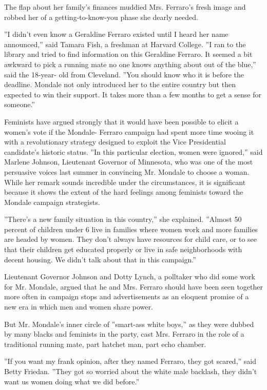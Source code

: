 The flap about her family's finances muddied Mrs. Ferraro's fresh image
and robbed her of a getting-to-know-you phase she dearly needed.

''I didn't even know a Geraldine Ferraro existed until I heard her name
announced,'' said Tamara Fish, a freshman at Harvard College. ''I ran to
the library and tried to find information on this Geraldine Ferraro. It
seemed a bit awkward to pick a running mate no one knows anything about
out of the blue,'' said the 18-year- old from Cleveland. ''You should
know who it is before the deadline. Mondale not only introduced her to
the entire country but then expected to win their support. It takes more
than a few months to get a sense for someone.''

Feminists have argued strongly that it would have been possible to
elicit a women's vote if the Mondale- Ferraro campaign had spent more
time wooing it with a revolutionary strategy designed to exploit the
Vice Presidential candidate's historic status. ''In this particular
election, women were ignored,'' said Marlene Johnson, Lieutenant
Governor of Minnesota, who was one of the most persuasive voices last
summer in convincing Mr. Mondale to choose a woman. While her remark
sounds incredible under the circumstances, it is significant because it
shows the extent of the hard feelings among feminists toward the Mondale
campaign strategists.

''There's a new family situation in this country,'' she explained.
''Almost 50 percent of children under 6 live in families where women
work and more families are headed by women. They don't always have
resources for child care, or to see that their children get educated
properly or live in safe neighborhoods with decent housing. We didn't
talk about that in this campaign.''

Lieutenant Governor Johnson and Dotty Lynch, a polltaker who did some
work for Mr. Mondale, argued that he and Mrs. Ferraro should have been
seen together more often in campaign stops and advertisements as an
eloquent promise of a new era in which men and women share power.

But Mr. Mondale's inner circle of ''smart-ass white boys,'' as they were
dubbed by many blacks and feminists in the party, cast Mrs. Ferraro in
the role of a traditional running mate, part hatchet man, part echo
chamber.

''If you want my frank opinion, after they named Ferraro, they got
scared,'' said Betty Friedan. ''They got so worried about the white male
backlash, they didn't want us women doing what we did before.''

